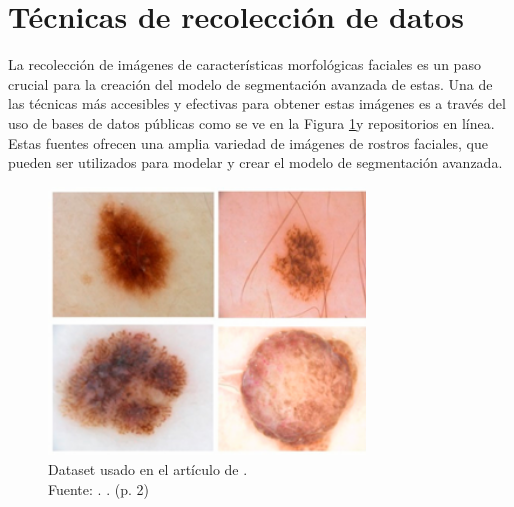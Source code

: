 \section{Técnicas de recolección de datos}
La recolección de imágenes de características morfológicas faciales es un paso crucial para la creación del modelo de segmentación avanzada de estas. Una de las técnicas más accesibles y efectivas para obtener estas imágenes es a través del uso de bases de datos públicas como se ve en la Figura \ref{3:fig2}y repositorios en línea. Estas fuentes ofrecen una amplia variedad de imágenes de rostros faciales, que pueden ser utilizados para modelar y crear el modelo de segmentación avanzada.

\begin{figure}[h]
	\begin{center}
		\includegraphics[width=0.75\textwidth]{3/figures/datapaper.png}
		\caption[Dataset usado en el artículo de \cite{karshiev2020improved}]{Dataset usado en el artículo de \cite{karshiev2020improved}.\\
		Fuente: \cite{karshiev2020improved}. . (p. 2)}
		\label{3:fig2}
	\end{center}
\end{figure}

